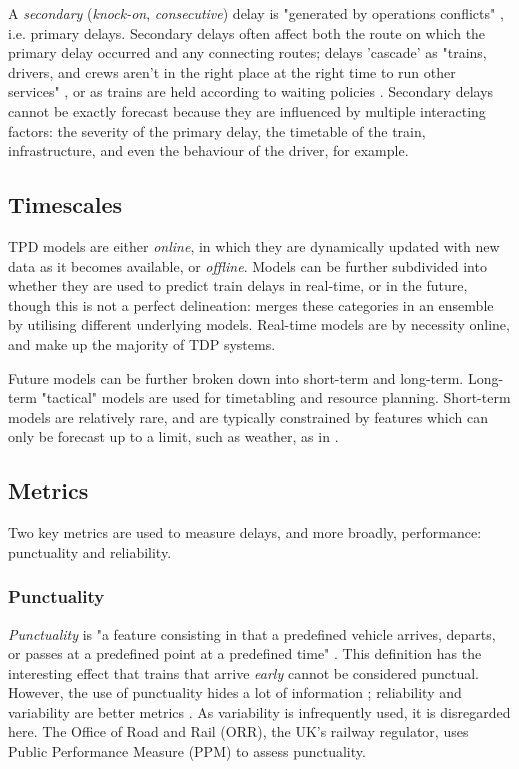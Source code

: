 \documentclass{article}
\begin{document}
A \textit{secondary} (\textit{knock-on}, \textit{consecutive}) delay is "generated by operations conflicts" \cite{cerreto_nielsen_harrod_nielsen_2016}, i.e. primary delays. Secondary delays often affect
both the route on which the primary delay occurred and any connecting routes; delays 'cascade' as "trains, drivers, and crews aren't in the right place at the right time to run other services" \cite{nr_knock_on_delays},
or as trains are held according to waiting policies \cite{berger_et_al_2011}. Secondary delays cannot be exactly forecast \cite{berger_et_al_2011}\cite{milinkovic_et_al_2013} because they are influenced by multiple interacting factors: the severity of the primary delay, the timetable of the train, infrastructure, and even the behaviour of the driver, for example. 

\subsection{Timescales}

TPD models are either \textit{online}, in which they are dynamically updated with new data as it becomes available, or \textit{offline}. Models can be further subdivided into whether they are used to predict train delays in real-time, or in the future, though this is not a perfect delineation: \cite{nair_et_al_2019} merges these categories in an ensemble by utilising different underlying models.   Real-time models are by necessity online, and make up the majority of TDP systems.

Future models can be further broken down into short-term and long-term. Long-term "tactical" \cite{markovic_et_al_2015} models are used for timetabling and resource planning. Short-term models are relatively rare, and are typically constrained by features which can only be forecast up to a limit, such as weather, as in \cite{nair_et_al_2019}\cite{wang_et_al_2019}.

\subsection{Metrics}

Two key metrics are used to measure delays, and more broadly, performance: punctuality and reliability. 

\subsubsection{Punctuality}

\textit{Punctuality} is "a feature consisting in that a predefined vehicle arrives, departs, or passes at a predefined point at a predefined time" \cite{rudnicki_1997}. This definition has the interesting effect that trains 
that arrive \textit{early} cannot be considered punctual. However, the use of punctuality hides a lot of information \cite{skagestad_2004}; reliability and variability are better metrics \cite{olsson_haugland_2004}. As variability is infrequently used, it is disregarded here. The Office of Road and Rail (ORR), the UK's railway regulator, uses Public Performance Measure (PPM) to assess punctuality.
\end{document}
